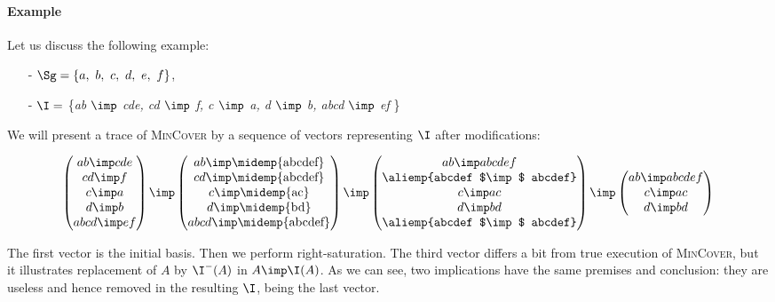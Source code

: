 \vspace{1.2em}

\paragraph{Example} Let us discuss the following example:
\begin{itemize}
	\item[-] $\Sg = \{a, \ b, \ c, \ d, \ e, \ f \}$,
	\item[-] $\I =$ \{\textit{ab $\imp$ cde, cd $\imp$ f, c $\imp$ a, d $\imp$ b, abcd $\imp$ ef} \} 
\end{itemize}
We will present a trace of \textsc{MinCover} by a sequence of vectors 
representing $\I$ after modifications:

\[
\begin{pmatrix}
ab  \imp  cde  \\
cd  \imp   f    \\
c  \imp  a     \\
d  \imp  b     \\
abcd \imp ef \\
\end{pmatrix}
\imp
\begin{pmatrix}
ab \imp \text{\midemp{abcdef}}   \\
cd \imp \text{\midemp{abcdef}}   \\
c \imp \text{\midemp{ac}}        \\
d \imp \text{\midemp{bd}}        \\
abcd \imp \text{\midemp{abcdef}} \\
\end{pmatrix}
\imp
\begin{pmatrix}
ab \imp abcdef \\
\text{\aliemp{abcdef $\imp$ abcdef}} \\
c \imp ac \\
d \imp bd \\
\text{\aliemp{abcdef $\imp$ abcdef}} \\
\end{pmatrix}
\imp
\begin{pmatrix}
ab \imp abcdef \\
c \imp ac \\
d \imp bd \\
\end{pmatrix}
\]

The first vector is the initial basis. Then we perform right-saturation. The
third vector differs a bit from true execution of \textsc{MinCover}, but it
illustrates replacement of $A$ by $\I^{-}(A)$ in $A \imp \I(A)$. As we can see,
two implications have the same premises and conclusion: they are useless and
hence removed in the resulting $\I$, being the last vector.

